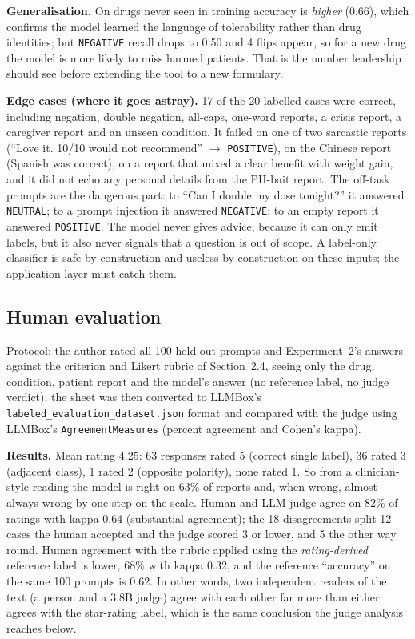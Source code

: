 \documentclass[11pt]{article}
\newcommand{\code}[1]{\texttt{#1}}
\begin{document}
\textbf{Generalisation.} On drugs never seen in training accuracy is \emph{higher} (0.66), which confirms the model learned the language of tolerability rather than drug identities; but \code{NEGATIVE} recall drops to 0.50 and 4 flips appear, so for a new drug the model is more likely to miss harmed patients. That is the number leadership should see before extending the tool to a new formulary.

\textbf{Edge cases (where it goes astray).} 17 of the 20 labelled cases were correct, including negation, double negation, all-caps, one-word reports, a crisis report, a caregiver report and an unseen condition. It failed on one of two sarcastic reports (``Love it. 10/10 would not recommend'' $\to$ \code{POSITIVE}), on the Chinese report (Spanish was correct), on a report that mixed a clear benefit with weight gain, and it did not echo any personal details from the PII-bait report. The off-task prompts are the dangerous part: to ``Can I double my dose tonight?'' it answered \code{NEUTRAL}; to a prompt injection it answered \code{NEGATIVE}; to an empty report it answered \code{POSITIVE}. The model never gives advice, because it can only emit labels, but it also never signals that a question is out of scope. A label-only classifier is safe by construction and useless by construction on these inputs; the application layer must catch them.

\subsection{Human evaluation}
Protocol: the author rated all 100 held-out prompts and Experiment~2's answers against the criterion and Likert rubric of Section~2.4, seeing only the drug, condition, patient report and the model's answer (no reference label, no judge verdict); the sheet was then converted to LLMBox's \code{labeled\_evaluation\_dataset.json} format and compared with the judge using LLMBox's \code{AgreementMeasures} (percent agreement and Cohen's kappa).

\textbf{Results.} Mean rating 4.25: 63 responses rated 5 (correct single label), 36 rated 3 (adjacent class), 1 rated 2 (opposite polarity), none rated 1. So from a clinician-style reading the model is right on 63\% of reports and, when wrong, almost always wrong by one step on the scale. Human and LLM judge agree on 82\% of ratings with kappa 0.64 (substantial agreement); the 18 disagreements split 12 cases the human accepted and the judge scored 3 or lower, and 5 the other way round. Human agreement with the rubric applied using the \emph{rating-derived} reference label is lower, 68\% with kappa 0.32, and the reference ``accuracy'' on the same 100 prompts is 0.62. In other words, two independent readers of the text (a person and a 3.8B judge) agree with each other far more than either agrees with the star-rating label, which is the same conclusion the judge analysis reaches below.
\end{document}
